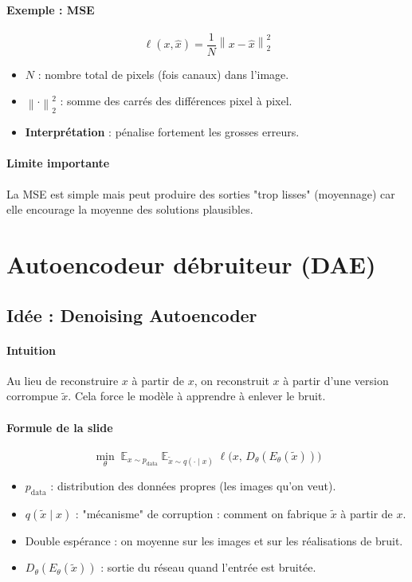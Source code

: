 \documentclass[11pt,a4paper]{article}
\newcommand{\E}{\mathbb{E}}
\newcommand{\norm}[1]{\left\lVert #1 \right\rVert}
\begin{document}
\paragraph{Exemple : MSE}
\[
  \ell(x,\hat{x}) = \frac{1}{N}\norm{x-\hat{x}}_2^2
\]
\begin{itemize}
  \item $N$ : nombre total de pixels (fois canaux) dans l'image.
  \item $\norm{\cdot}_2^2$ : somme des carrés des différences pixel à pixel.
  \item \textbf{Interprétation} : pénalise fortement les grosses erreurs.
\end{itemize}

\paragraph{Limite importante}
La MSE est simple mais peut produire des sorties "trop lisses" (moyennage) car elle encourage la moyenne des solutions plausibles.

\section{Autoencodeur débruiteur (DAE)}

\subsection{Idée : Denoising Autoencoder}
\paragraph{Intuition}
Au lieu de reconstruire $x$ à partir de $x$, on reconstruit $x$ à partir d'une version corrompue $\tilde{x}$. Cela force le modèle à apprendre à enlever le bruit.

\paragraph{Formule de la slide}
\[
  \min_\theta\; \E_{x\sim p_{\text{data}}}\; \E_{\tilde{x}\sim q(\cdot\mid x)}\; \ell\big(x,\, D_\theta(E_\theta(\tilde{x}))\big)
\]
\begin{itemize}
  \item $p_{\text{data}}$ : distribution des données propres (les images qu'on veut).
  \item $q(\tilde{x}\mid x)$ : "mécanisme" de corruption : comment on fabrique $\tilde{x}$ à partir de $x$.
  \item Double espérance : on moyenne sur les images et sur les réalisations de bruit.
  \item $D_\theta(E_\theta(\tilde{x}))$ : sortie du réseau quand l'entrée est bruitée.
\end{itemize}
\end{document}
